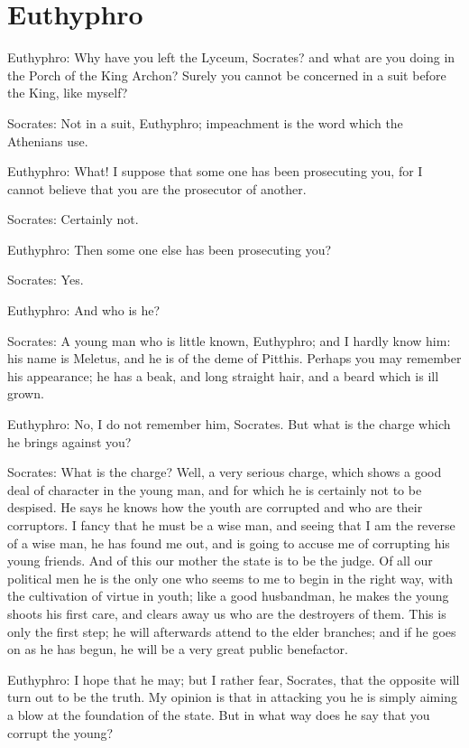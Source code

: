 

\chapter{Euthyphro} %
\label{cha:euthyphro}


Euthyphro: Why have you left the Lyceum, Socrates? and what are
 you doing in the Porch of the King Archon?
Surely you cannot be concerned in a suit before the King, like myself?

Socrates: Not in a suit, Euthyphro; impeachment is the word which the Athenians use.

Euthyphro: What! I suppose that some one has been prosecuting you, for I cannot believe that you are the prosecutor of another.

Socrates: Certainly not.

Euthyphro: Then some one else has been prosecuting you?

Socrates: Yes.

Euthyphro: And who is he?

Socrates: A young man who is little known, Euthyphro; and I hardly know him: his name is Meletus, and he is of the deme of Pitthis. Perhaps you may remember his appearance; he has a beak, and long straight hair, and a beard which is ill grown.

Euthyphro: No, I do not remember him, Socrates. But what is the charge which he brings against you?

Socrates: What is the charge? Well, a very serious charge, which shows a good deal of character in the young man, and for which he is certainly not to be despised. He says he knows how the youth are corrupted and who are their corruptors. I fancy that he must be a wise man, and seeing that I am the reverse of a wise man, he has found me out, and is going to accuse me of corrupting his young friends. And of this our mother the state is to be the judge. Of all our political men he is the only one who seems to me to begin in the right way, with the cultivation of virtue in youth; like a good husbandman, he makes the young shoots his first care, and clears away us who are the destroyers of them. This is only the first step; he will afterwards attend to the elder branches; and if he goes on as he has begun, he will be a very great public benefactor.

Euthyphro: I hope that he may; but I rather fear, Socrates, that the opposite will turn out to be the truth. My opinion is that in attacking you he is simply aiming a blow at the foundation of the state. But in what way does he say that you corrupt the young?

